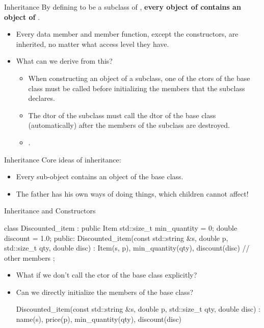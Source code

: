 \documentclass{beamer}
\begin{document}
\begin{frame}[fragile]{Inheritance}
    By defining  to be a subclass of , \textbf{every object of  contains an object of }.
    \begin{itemize}
        \item Every data member and member function, except the constructors, are inherited, no matter what access level they have.
        \item What can we derive from this?
        \begin{itemize}
            \item When constructing an object of a subclass, one of the ctors of the base class must be called before initializing the members that the subclass declares.
            \item The dtor of the subclass must call the dtor of the base class (automatically) after the members of the subclass are destroyed.
            \item {}.
        \end{itemize}
    \end{itemize}
\end{frame}

\begin{frame}{Inheritance}
    Core ideas of inheritance:
    \begin{itemize}
        \item Every sub-object contains an object of the base class.
        \item The father has his own ways of doing things, which children cannot affect!
    \end{itemize}
\end{frame}

\begin{frame}[fragile]{Inheritance and Constructors}
    \begin{cpp}
class Discounted_item : public Item {
  std::size_t min_quantity = 0;
  double discount = 1.0;
 public:
  Discounted_item(const std::string &s, double p,
                  std::size_t qty, double disc)
      : Item(s, p), min_quantity(qty), discount(disc) {}
  // other members
};
    \end{cpp}
    \begin{itemize}
        \item What if we don't call the ctor of the base class explicitly?
        \item Can we directly initialize the members of the base class?
        \begin{cpp}
Discounted_item(const std::string &s, double p,
                std::size_t qty, double disc)
    : name(s), price(p), min_quantity(qty),
      discount(disc) {}
        \end{cpp}
    \end{itemize}
\end{frame}
\end{document}
